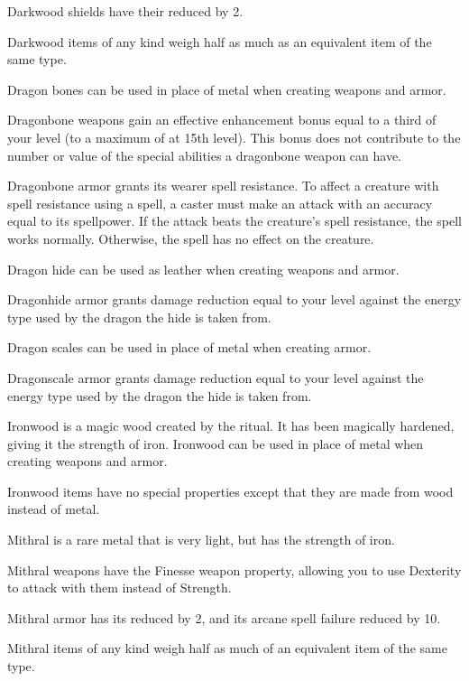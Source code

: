 Darkwood shields have their  reduced by 2.

Darkwood items of any kind weigh half as much as an equivalent item of the same type.


Dragon bones can be used in place of metal when creating weapons and armor.

Dragonbone weapons gain an effective enhancement bonus equal to a third of your level (to a maximum of  at 15th level).
This bonus does not contribute to the number or value of the special abilities a dragonbone weapon can have.

Dragonbone armor grants its wearer spell resistance.
To affect a creature with spell resistance using a spell, a caster must make an attack with an accuracy equal to its spellpower.
If the attack beats the creature's spell resistance, the spell works normally.
Otherwise, the spell has no effect on the creature.


Dragon hide can be used as leather when creating weapons and armor.

Dragonhide armor grants damage reduction equal to your level against the energy type used by the dragon the hide is taken from.


Dragon scales can be used in place of metal when creating armor.

Dragonscale armor grants damage reduction equal to your level against the energy type used by the dragon the hide is taken from.

Ironwood is a magic wood created by the  ritual.
It has been magically hardened, giving it the strength of iron.
Ironwood can be used in place of metal when creating weapons and armor.

Ironwood items have no special properties except that they are made from wood instead of metal.

Mithral is a rare metal that is very light, but has the strength of iron.

Mithral weapons have the Finesse weapon property, allowing you to use Dexterity to attack with them instead of Strength.

Mithral armor has its  reduced by 2, and its arcane spell failure reduced by 10.

Mithral items of any kind weigh half as much of an equivalent item of the same type.

